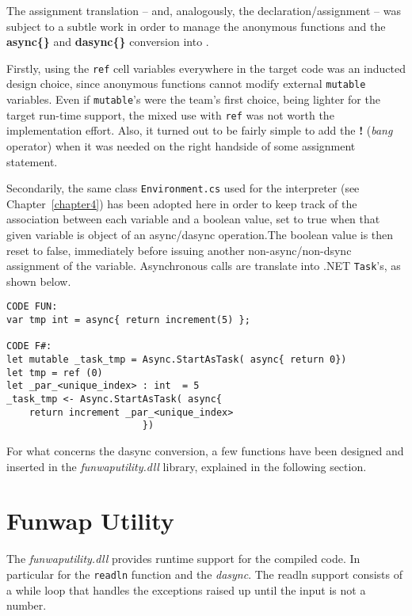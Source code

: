 The assignment translation -- and, analogously, the declaration/assignment -- was subject to a subtle work in order to manage the anonymous functions and the \textbf{async\{\}} and \textbf{dasync\{\}} conversion into \fsharp. 

Firstly, using the \texttt{ref} cell variables everywhere in the target code was an inducted design choice, since \fsharp anonymous functions cannot modify external \texttt{mutable} variables. Even if \texttt{mutable}'s were the team's first choice, being lighter for the target run-time support, the mixed use with \texttt{ref} was not worth the implementation effort. Also, it turned out to be fairly simple to add the \textbf{!} (\textit{bang} operator) when it was needed on the right handside of some assignment statement.

Secondarily, the same class \texttt{Environment.cs} used for the interpreter (see Chapter~\ref{chapter4}) has been adopted here in order to keep track of the association between each variable and a boolean value, set to true when that given variable is object of an async/dasync operation.The boolean value is then reset to false, immediately before issuing another non-async/non-dsync assignment of the variable. Asynchronous calls are translate into .NET \texttt{Task}'s, as shown below.

\begin{lstlisting}[caption=Example of \texttt{async\{\}} block translation.]
CODE FUN:
var tmp int = async{ return increment(5) };

CODE F#:
let mutable _task_tmp = Async.StartAsTask( async{ return 0})
let tmp = ref (0)
let _par_<unique_index> : int  = 5
_task_tmp <- Async.StartAsTask( async{
	return increment _par_<unique_index>
						})
\end{lstlisting}

For what concerns the dasync{} conversion, a few functions have been designed and inserted in the \textit{funwaputility.dll} library, explained in the following section.

\section{Funwap Utility}
The \textit{funwaputility.dll} provides \fsharp runtime support for the compiled code. In particular for the \texttt{readln} function and the \textit{dasync}. The readln support consists of a while loop that handles the exceptions raised up until the input is not a number.\\

